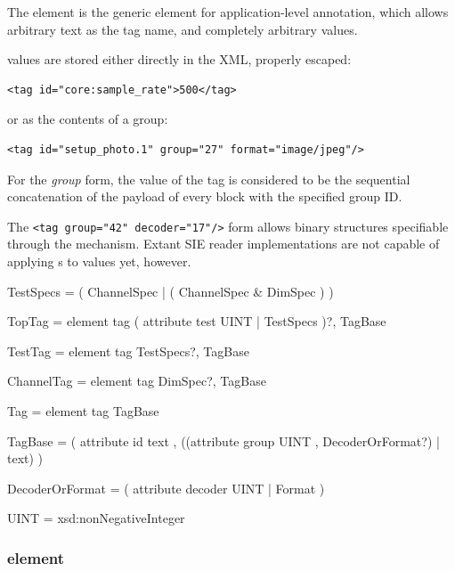 \documentclass{article}
\begin{document}
The  element is the generic element for application-level
annotation, which allows arbitrary text as the tag name, and
completely arbitrary values.

 values are stored either directly in the XML, properly escaped:
\begin{lstlisting}[language=siexml]
<tag id="core:sample_rate">500</tag>
\end{lstlisting}
or as the contents of a group:
\begin{lstlisting}[language=siexml]
<tag id="setup_photo.1" group="27" format="image/jpeg"/>
\end{lstlisting}

For the \emph{group} form, the value of the tag is considered to be
the sequential concatenation of the payload of every block with the
specified group ID.

The \lstinline[language=siexml]!<tag group="42" decoder="17"/>! form
allows binary structures specifiable through the 
mechanism. Extant SIE reader implementations are not capable of
applying s to  values yet, however.

\begin{grammar}
TestSpecs = ( ChannelSpec | ( ChannelSpec & DimSpec ) )
\end{grammar}
\begin{grammar}
TopTag = element tag {
  ( attribute test { UINT } | TestSpecs )?,
  TagBase
}
\end{grammar}
\begin{grammar}
TestTag = element tag {
  TestSpecs?,
  TagBase
}
\end{grammar}
\begin{grammar}
ChannelTag = element tag {
  DimSpec?,
  TagBase
}
\end{grammar}
\begin{grammar}
Tag = element tag {
  TagBase
}
\end{grammar}
\begin{grammar}
TagBase = (
  attribute id { text },
  ((attribute group { UINT }, DecoderOrFormat?) | text)
)
\end{grammar}
\begin{grammar}
DecoderOrFormat = ( attribute decoder { UINT } | Format )
\end{grammar}
\begin{grammar}
UINT = xsd:nonNegativeInteger
\end{grammar}

\subsubsection{ element}
\end{document}
